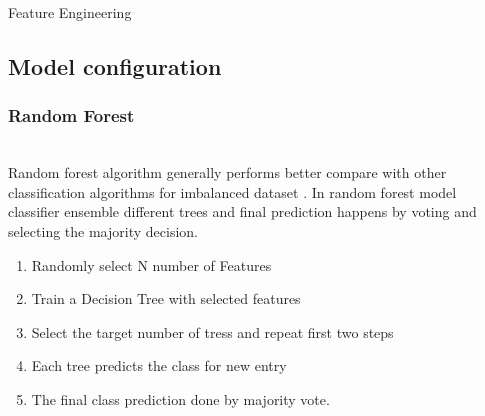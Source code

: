 \begin{algorithm}[h]
    \caption{Feature Engineering}
    \label{alg:features}

    

\end{algorithm}




\subsection{Model configuration}

\subsubsection{Random Forest}\hspace*{\fill} \\
Random forest algorithm generally performs better compare with other classification algorithms for imbalanced dataset \cite{Valecha2018PredictionOC}. In random forest model classifier ensemble different trees and final prediction happens by voting and selecting the majority decision. 

\begin{enumerate}
    \item Randomly select N number of Features
    \item Train a Decision Tree with selected features
    \item Select the target number of tress and repeat first two steps 
    \item Each tree predicts the class for new entry
    \item The final class prediction done by majority vote. 
\end{enumerate}


